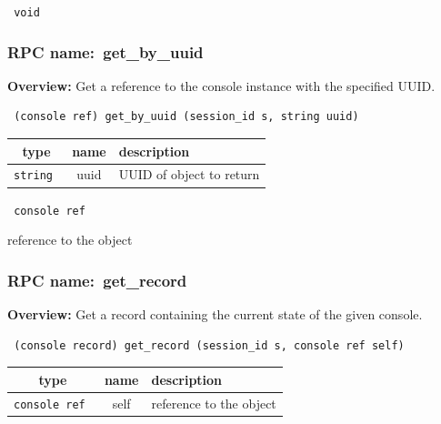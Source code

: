 \vspace{0.3cm}

{\tt 
void
}



\vspace{0.3cm}
\vspace{0.3cm}
\vspace{0.3cm}
\subsubsection{RPC name:~get\_by\_uuid}

{\bf Overview:} 
Get a reference to the console instance with the specified UUID.

\begin{verbatim} (console ref) get_by_uuid (session_id s, string uuid)\end{verbatim}



 
\vspace{0.3cm}
\begin{tabular}{|c|c|p{7cm}|}
 \hline
{\bf type} & {\bf name} & {\bf description} \\ \hline
{\tt string } & uuid & UUID of object to return \\ \hline 

\end{tabular}

\vspace{0.3cm}

{\tt 
console ref
}


reference to the object
\vspace{0.3cm}
\vspace{0.3cm}
\vspace{0.3cm}
\subsubsection{RPC name:~get\_record}

{\bf Overview:} 
Get a record containing the current state of the given console.

\begin{verbatim} (console record) get_record (session_id s, console ref self)\end{verbatim}



 
\vspace{0.3cm}
\begin{tabular}{|c|c|p{7cm}|}
 \hline
{\bf type} & {\bf name} & {\bf description} \\ \hline
{\tt console ref } & self & reference to the object \\ \hline 

\end{tabular}

